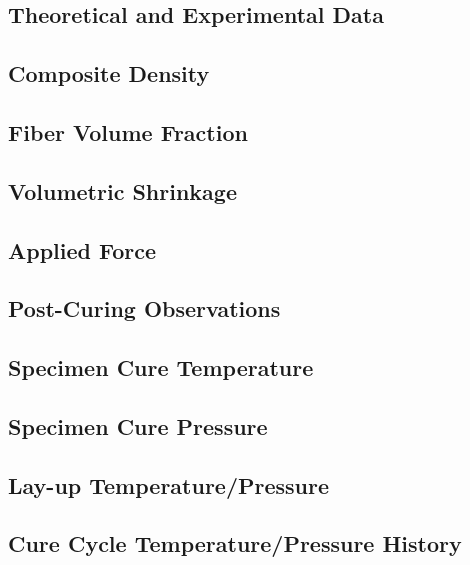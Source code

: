 \subsection{Theoretical and Experimental Data}


\clearpage
\subsection{Composite Density}


\subsection{Fiber Volume Fraction}


\clearpage
\subsection{Volumetric Shrinkage}


\subsection{Applied Force}


\clearpage
\subsection{Post-Curing Observations}


\subsection{Specimen Cure Temperature}


\subsection{Specimen Cure Pressure}


\clearpage
\subsection{Lay-up Temperature/Pressure}


\subsection{Cure Cycle Temperature/Pressure History}



